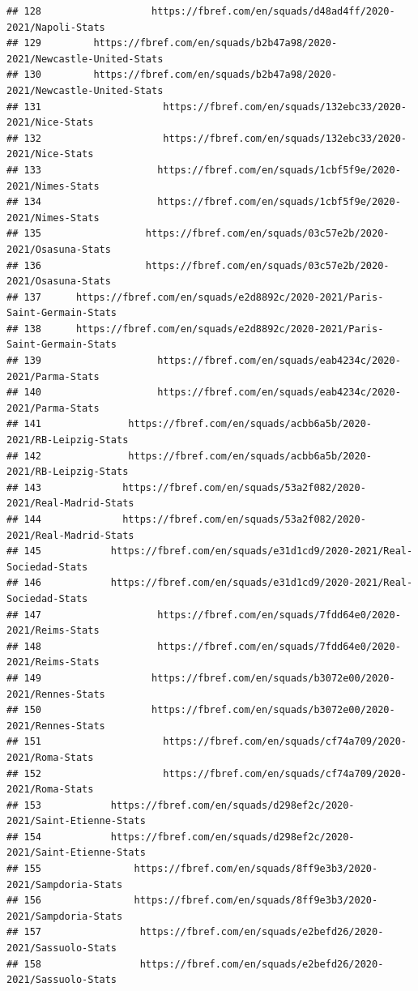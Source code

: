\documentclass[
]{book}
\theoremstyle{definition}
\theoremstyle{definition}
\theoremstyle{definition}
\theoremstyle{definition}
\theoremstyle{remark}
\begin{document}
\begin{verbatim}
## 128                   https://fbref.com/en/squads/d48ad4ff/2020-2021/Napoli-Stats
## 129         https://fbref.com/en/squads/b2b47a98/2020-2021/Newcastle-United-Stats
## 130         https://fbref.com/en/squads/b2b47a98/2020-2021/Newcastle-United-Stats
## 131                     https://fbref.com/en/squads/132ebc33/2020-2021/Nice-Stats
## 132                     https://fbref.com/en/squads/132ebc33/2020-2021/Nice-Stats
## 133                    https://fbref.com/en/squads/1cbf5f9e/2020-2021/Nimes-Stats
## 134                    https://fbref.com/en/squads/1cbf5f9e/2020-2021/Nimes-Stats
## 135                  https://fbref.com/en/squads/03c57e2b/2020-2021/Osasuna-Stats
## 136                  https://fbref.com/en/squads/03c57e2b/2020-2021/Osasuna-Stats
## 137      https://fbref.com/en/squads/e2d8892c/2020-2021/Paris-Saint-Germain-Stats
## 138      https://fbref.com/en/squads/e2d8892c/2020-2021/Paris-Saint-Germain-Stats
## 139                    https://fbref.com/en/squads/eab4234c/2020-2021/Parma-Stats
## 140                    https://fbref.com/en/squads/eab4234c/2020-2021/Parma-Stats
## 141               https://fbref.com/en/squads/acbb6a5b/2020-2021/RB-Leipzig-Stats
## 142               https://fbref.com/en/squads/acbb6a5b/2020-2021/RB-Leipzig-Stats
## 143              https://fbref.com/en/squads/53a2f082/2020-2021/Real-Madrid-Stats
## 144              https://fbref.com/en/squads/53a2f082/2020-2021/Real-Madrid-Stats
## 145            https://fbref.com/en/squads/e31d1cd9/2020-2021/Real-Sociedad-Stats
## 146            https://fbref.com/en/squads/e31d1cd9/2020-2021/Real-Sociedad-Stats
## 147                    https://fbref.com/en/squads/7fdd64e0/2020-2021/Reims-Stats
## 148                    https://fbref.com/en/squads/7fdd64e0/2020-2021/Reims-Stats
## 149                   https://fbref.com/en/squads/b3072e00/2020-2021/Rennes-Stats
## 150                   https://fbref.com/en/squads/b3072e00/2020-2021/Rennes-Stats
## 151                     https://fbref.com/en/squads/cf74a709/2020-2021/Roma-Stats
## 152                     https://fbref.com/en/squads/cf74a709/2020-2021/Roma-Stats
## 153            https://fbref.com/en/squads/d298ef2c/2020-2021/Saint-Etienne-Stats
## 154            https://fbref.com/en/squads/d298ef2c/2020-2021/Saint-Etienne-Stats
## 155                https://fbref.com/en/squads/8ff9e3b3/2020-2021/Sampdoria-Stats
## 156                https://fbref.com/en/squads/8ff9e3b3/2020-2021/Sampdoria-Stats
## 157                 https://fbref.com/en/squads/e2befd26/2020-2021/Sassuolo-Stats
## 158                 https://fbref.com/en/squads/e2befd26/2020-2021/Sassuolo-Stats

\end{verbatim}
\end{document}
